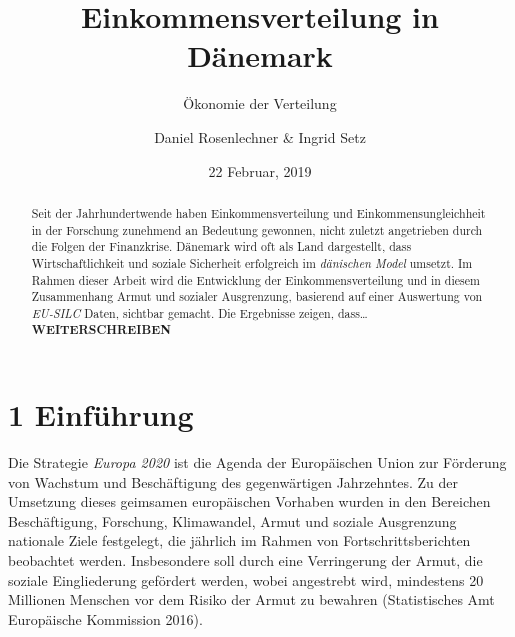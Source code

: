 \documentclass[12pt,]{article}
\title{Einkommensverteilung in Dänemark}
\subtitle{Ökonomie der Verteilung}
\author{Daniel Rosenlechner \& Ingrid Setz}
\date{22 Februar, 2019}
\begin{document}
\maketitle
\begin{abstract}
Seit der Jahrhundertwende haben Einkommensverteilung und
Einkommensungleichheit in der Forschung zunehmend an Bedeutung gewonnen,
nicht zuletzt angetrieben durch die Folgen der Finanzkrise. Dänemark
wird oft als Land dargestellt, dass Wirtschaftlichkeit und soziale
Sicherheit erfolgreich im \emph{dänischen Model} umsetzt. Im Rahmen
dieser Arbeit wird die Entwicklung der Einkommensverteilung und in
diesem Zusammenhang Armut und sozialer Ausgrenzung, basierend auf einer
Auswertung von \emph{EU-SILC} Daten, sichtbar gemacht. Die Ergebnisse
zeigen, dass\ldots{}\textbf{WEITERSCHREIBEN}
\end{abstract}

\newpage 

\tableofcontents
\newpage  \listoffigures
\listoftables
\newpage

\newpage

\section{1 Einführung}\label{einfuhrung}

Die Strategie \emph{Europa 2020} ist die Agenda der Europäischen Union
zur Förderung von Wachstum und Beschäftigung des gegenwärtigen
Jahrzehntes. Zu der Umsetzung dieses geimsamen europäischen Vorhaben
wurden in den Bereichen Beschäftigung, Forschung, Klimawandel, Armut und
soziale Ausgrenzung nationale Ziele festgelegt, die jährlich im Rahmen
von Fortschrittsberichten beobachtet werden. Insbesondere soll durch
eine Verringerung der Armut, die soziale Eingliederung gefördert werden,
wobei angestrebt wird, mindestens 20 Millionen Menschen vor dem Risiko
der Armut zu bewahren (Statistisches Amt Europäische Kommission 2016).
\end{document}
